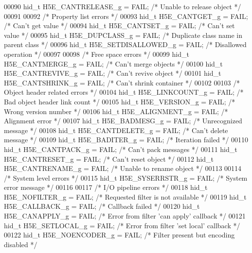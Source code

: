 \begin{DoxyCode}
00090 hid\_t H5E\_CANTRELEASE\_g    = FAIL;      \textcolor{comment}{/* Unable to release object */}
00091 
00092 \textcolor{comment}{/* Property list errors */}
00093 hid\_t H5E\_CANTGET\_g        = FAIL;      \textcolor{comment}{/* Can't get value */}
00094 hid\_t H5E\_CANTSET\_g        = FAIL;      \textcolor{comment}{/* Can't set value */}
00095 hid\_t H5E\_DUPCLASS\_g       = FAIL;      \textcolor{comment}{/* Duplicate class name in parent class */}
00096 hid\_t H5E\_SETDISALLOWED\_g  = FAIL;      \textcolor{comment}{/* Disallowed operation */}
00097 
00098 \textcolor{comment}{/* Free space errors */}
00099 hid\_t H5E\_CANTMERGE\_g      = FAIL;      \textcolor{comment}{/* Can't merge objects */}
00100 hid\_t H5E\_CANTREVIVE\_g     = FAIL;      \textcolor{comment}{/* Can't revive object */}
00101 hid\_t H5E\_CANTSHRINK\_g     = FAIL;      \textcolor{comment}{/* Can't shrink container */}
00102 
00103 \textcolor{comment}{/* Object header related errors */}
00104 hid\_t H5E\_LINKCOUNT\_g      = FAIL;      \textcolor{comment}{/* Bad object header link count */}
00105 hid\_t H5E\_VERSION\_g        = FAIL;      \textcolor{comment}{/* Wrong version number */}
00106 hid\_t H5E\_ALIGNMENT\_g      = FAIL;      \textcolor{comment}{/* Alignment error */}
00107 hid\_t H5E\_BADMESG\_g        = FAIL;      \textcolor{comment}{/* Unrecognized message */}
00108 hid\_t H5E\_CANTDELETE\_g     = FAIL;      \textcolor{comment}{/* Can't delete message */}
00109 hid\_t H5E\_BADITER\_g        = FAIL;      \textcolor{comment}{/* Iteration failed */}
00110 hid\_t H5E\_CANTPACK\_g       = FAIL;      \textcolor{comment}{/* Can't pack messages */}
00111 hid\_t H5E\_CANTRESET\_g      = FAIL;      \textcolor{comment}{/* Can't reset object */}
00112 hid\_t H5E\_CANTRENAME\_g     = FAIL;      \textcolor{comment}{/* Unable to rename object */}
00113 
00114 \textcolor{comment}{/* System level errors */}
00115 hid\_t H5E\_SYSERRSTR\_g      = FAIL;      \textcolor{comment}{/* System error message */}
00116 
00117 \textcolor{comment}{/* I/O pipeline errors */}
00118 hid\_t H5E\_NOFILTER\_g       = FAIL;      \textcolor{comment}{/* Requested filter is not available */}
00119 hid\_t H5E\_CALLBACK\_g       = FAIL;      \textcolor{comment}{/* Callback failed */}
00120 hid\_t H5E\_CANAPPLY\_g       = FAIL;      \textcolor{comment}{/* Error from filter 'can apply' callback */}
00121 hid\_t H5E\_SETLOCAL\_g       = FAIL;      \textcolor{comment}{/* Error from filter 'set local' callback */}
00122 hid\_t H5E\_NOENCODER\_g      = FAIL;      \textcolor{comment}{/* Filter present but encoding disabled */}

\end{DoxyCode}
